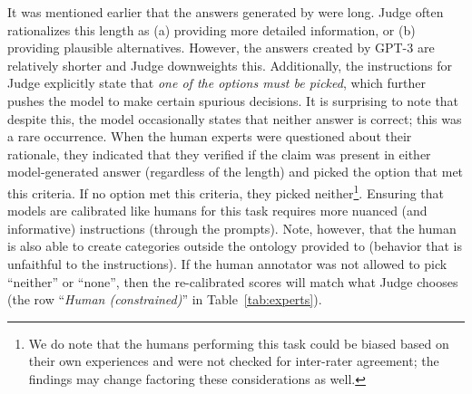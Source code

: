  It was mentioned earlier that the answers generated by \DV were long. Judge \DV often rationalizes this length as (a) providing more detailed information, or (b) providing plausible alternatives. However, the answers created by GPT-3 are relatively shorter and Judge \DV downweights this. Additionally, the instructions for Judge \DV explicitly state that \textit{one of the options must be picked}, which further pushes the model to make certain spurious decisions. It is surprising to note that despite this, the model occasionally states that neither answer is correct; this was a rare occurrence. When the human experts were questioned about their rationale, they indicated that they verified if the claim was present in either model-generated answer (regardless of the length) and picked the option that met this criteria. If no option met this criteria, they picked neither\footnote{We do note that the humans performing this task could be biased based on their own experiences and were not checked for inter-rater agreement; the findings may change factoring these considerations as well.}. 
Ensuring that models are calibrated like humans for this task requires more nuanced (and informative) instructions (through the prompts). Note, however, that the human is also able to create categories outside the ontology provided to \DV (behavior that is unfaithful to the instructions). If the human annotator was not allowed to pick ``neither'' or ``none'', then the re-calibrated scores will match what Judge \DV chooses (the row ``\textit{Human (constrained)}'' in Table~\ref{tab:experts}).  






